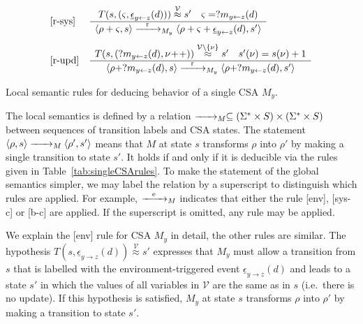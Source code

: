 \documentclass{sig-alternate}
\newcommand{\e}{\epsilon}
\newcommand{\V}{\mathcal{V}}
\newcommand{\locev}[1]{\underline{#1}}
\newcommand{\vareq}[1]{\overset{#1}{\approx}}
\newcommand{\env}[4]{\locev{#1}_{{#2} \rightarrow {#3}}(#4)}
\newcommand{\sys}[4]{\locev{#1}_{{#2} \leftarrow {#3}}(#4)}
\newcommand{\tab}[1]{Table~\ref{tab:#1}}
\newcommand{\figvspace}{\vspace{-0.2in}}
\begin{document}
\begin{table}
\begin{equation*}
\begin{array}{ll}
\text{[r-sys]} &
\frac{
\begin{array}{cc}
T(s, (\varsigma, \sys{\e}{y}{z}{d})) \vareq{\V} s' & \varsigma = ?m_{y \leftarrow z}(d)
\end{array}}{
\begin{array}{c}
\langle \rho + \varsigma, s \rangle \smallstep{\mathrm{r}}{y} \langle \rho + \varsigma + \sys{\e}{y}{z}{d}, s' \rangle
\end{array}} \\[\lsp]

\text{[r-upd]} &
\frac{
\begin{array}{cc}
T(s, (?m_{y \leftarrow z}(d), \nu\!+\!+)) \vareq{\V \backslash \{\nu\}} s' & s'(\nu) = s(\nu) + 1
\end{array}}{
\begin{array}{c}
\langle \rho + ?m_{y \leftarrow z}(d), s \rangle \smallstep{\mathrm{r}}{y} \langle \rho + ?m_{y \leftarrow z}(d), s' \rangle
\end{array}}

\end{array}
\end{equation*}
\caption{Local semantic rules for deducing behavior of a single CSA $M_y$.}
\label{tab:singleCSArules}
\figvspace
\end{table}




The local semantics is defined by a relation $\xrightarrow{\hspace{0.3cm}{}\hspace{0.3cm}}_{M_{}} \subseteq (\Sigma^* \times S) \times (\Sigma^* \times S)$ between sequences of transition labels and CSA states. The statement $\langle \rho, s \rangle \xrightarrow{\hspace{0.3cm}{}\hspace{0.3cm}}_{M_{}} \langle \rho', s' \rangle$ means that $M$ at state $s$ transforms $\rho$ into $\rho'$ by making a single transition to state $s'$. It holds if and only if it is deducible via the rules given in \tab{singleCSArules}. To make the statement of the global semantics simpler, we may label the relation by a superscript to distinguish which rules are applied. For example, $\xrightarrow{\hspace{0.3cm}{\mathrm{e}}\hspace{0.3cm}}_{M_{}}$ indicates that either the rule [env], [sys-c] or [b-c] are applied. If the superscript is omitted, any rule may be applied.

We explain the [env] rule for CSA $M_y$ in detail, the other rules are similar. The hypothesis $T(s, \env{\e}{y}{z}{d}) \vareq{\V} s'$ expresses that $M_y$ must allow a transition from $s$ that is labelled with the environment-triggered event $\env{\e}{y}{z}{d}$ and leads to a state $s'$ in which the values of all variables in $\V$ are the same as in $s$ (i.e.\ there is no update). If this hypothesis is satisfied, $M_y$ at state $s$ transforms $\rho$ into $\rho'$ by making a transition to state $s'$.
\end{document}
